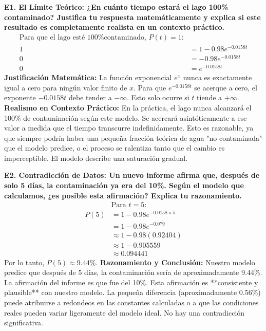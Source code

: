 \documentclass[12pt, a4paper]{article}
\begin{document}
\vspace{0.5em}
\noindent \textbf{E1. El Límite Teórico: ¿En cuánto tiempo estará el lago 100\% contaminado? Justifica tu respuesta matemáticamente y explica si este resultado es completamente realista en un contexto práctico.}
\begin{align*}
\text{Para que el lago esté 100\% contaminado, } P(t) = 1\text{:} \\
1 &= 1 - 0.98e^{-0.0158t} \\
0 &= -0.98e^{-0.0158t} \\
0 &= e^{-0.0158t}
\end{align*}
\textbf{Justificación Matemática:} La función exponencial $e^x$ nunca es exactamente igual a cero para ningún valor finito de $x$. Para que $e^{-0.0158t}$ se acerque a cero, el exponente $-0.0158t$ debe tender a $-\infty$. Esto solo ocurre si $t$ tiende a $+\infty$.
\textbf{Realismo en Contexto Práctico:} En la práctica, el lago nunca alcanzará el 100\% de contaminación según este modelo. Se acercará asintóticamente a ese valor a medida que el tiempo transcurre indefinidamente. Esto es razonable, ya que siempre podría haber una pequeña fracción teórica de agua "no contaminada" que el modelo predice, o el proceso se ralentiza tanto que el cambio es imperceptible. El modelo describe una saturación gradual.

\vspace{0.5em}
\noindent \textbf{E2. Contradicción de Datos: Un nuevo informe afirma que, después de solo 5 días, la contaminación ya era del 10\%. Según el modelo que calculamos, ¿es posible esta afirmación? Explica tu razonamiento.}
\begin{align*}
&\text{Para } t=5:\\
P(5) &= 1 - 0.98e^{-0.0158 \times 5} \\
&= 1 - 0.98e^{-0.079} \\
&\approx 1 - 0.98(0.92404) \\
&\approx 1 - 0.905559 \\
&\approx 0.094441
\end{align*}
Por lo tanto, $P(5) \approx 9.44\%$.
\textbf{Razonamiento y Conclusión:} Nuestro modelo predice que después de 5 días, la contaminación sería de aproximadamente 9.44\%. La afirmación del informe es que fue del 10\%. Esta afirmación es **consistente y plausible** con nuestro modelo. La pequeña diferencia (aproximadamente 0.56\%) puede atribuirse a redondeos en las constantes calculadas o a que las condiciones reales pueden variar ligeramente del modelo ideal. No hay una contradicción significativa.
\end{document}
